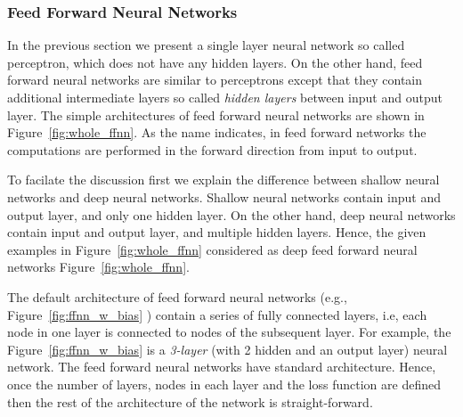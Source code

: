 \subsubsection{Feed Forward Neural Networks}
In the previous section we present a single layer neural network so called perceptron, which does not have any hidden layers. On the other hand, feed forward neural networks are similar to perceptrons except that they contain additional intermediate layers so called \textit{hidden layers} between input and output layer. The simple architectures of feed forward neural networks are shown in Figure~\ref{fig:whole_ffnn}. As the name indicates, in feed forward networks the computations are performed in the forward direction from input to output. 

To facilate the discussion first we explain the difference between  shallow neural networks and deep neural networks. Shallow neural networks contain input and output layer, and only one hidden layer. On the other hand, deep neural networks contain input and output layer, and multiple hidden layers. Hence, the given examples in Figure~\ref{fig:whole_ffnn} considered as
deep feed forward neural networks Figure~\ref{fig:whole_ffnn}.




The default architecture of feed forward neural networks (e.g., Figure~\ref{fig:ffnn_w_bias} ) contain a series of fully connected layers, i.e, each node in one layer is connected to nodes of the subsequent layer. For example, the Figure~\ref{fig:ffnn_w_bias} is a \textit{3-layer} (with 2 hidden and an output layer) neural network. The feed forward neural networks have standard architecture. Hence, once the number of layers, nodes in each layer and the loss function are defined then the rest of the architecture of the network is straight-forward.

